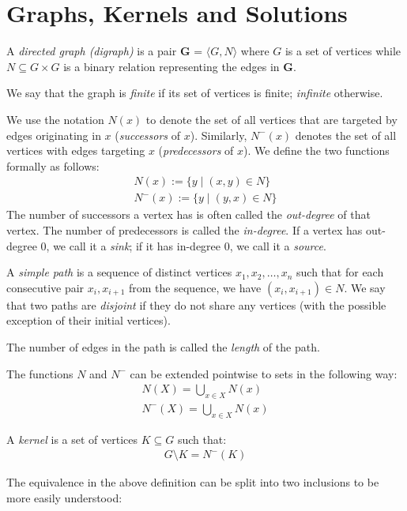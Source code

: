 \section{Graphs, Kernels and Solutions}
\label{sec:Graphs, Kernels and Solutions}
\begin{definition}
  A \textit{directed graph (digraph)} is a pair \textbf{G} = $\langle G,N \rangle$ where $G$ is a set of vertices while $N \subseteq G \times G$ is a binary relation representing the edges in \textbf{G}.
\end{definition}
We say that the graph is \textit{finite} if its set of vertices is finite; \textit{infinite} otherwise.

We use the notation $N(x)$ to denote the set of all vertices that are targeted by edges originating in $x$ (\textit{successors} of $x$).
Similarly, $N^-(x)$ denotes the set of all vertices with edges targeting $x$ (\textit{predecessors} of $x$).
We define the two functions formally as follows:
\begin{align}
  N(x) := \{y \;|\; (x,y) \in N\}\\
  N^-(x) := \{ y \;|\; (y,x) \in N \}
\end{align}
The number of successors a vertex has is often called the \textit{out-degree} of that vertex.
The number of predecessors is called the \textit{in-degree}.
If a vertex has out-degree 0, we call it a \textit{sink}; if it has in-degree 0, we call it a \textit{source}.

\begin{definition}
  A \textit{simple path} is a sequence of distinct vertices $x_1,x_2,\dots,x_n$ such that for each consecutive pair $x_i,x_{i+1}$ from the sequence, we have $(x_i, x_{i+1}) \in N$.
  We say that two paths are \textit{disjoint} if they do not share any vertices (with the possible exception of their initial vertices).
\end{definition}
The number of edges in the path is called the \textit{length} of the path.

The functions $N$ and $N^-$ can be extended pointwise to sets in the following way:
\begin{align}
  N(X) = \bigcup_{x \in X} N(x)\\
  N^-(X) = \bigcup_{x \in X} N(x)
\end{align}

\begin{definition}
  A \textit{kernel} is a set of vertices $K \subseteq G$ such that:
  \begin{align}
    G \setminus K = N^-(K)
  \end{align}
\end{definition}
The equivalence in the above definition can be split into two inclusions to be more easily understood:


